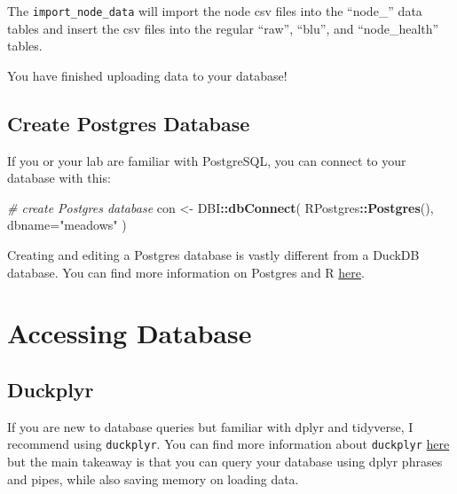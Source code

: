 \documentclass[
]{book}
\newenvironment{Shaded}{\begin{snugshade}}{\end{snugshade}}
\newcommand{\AttributeTok}[1]{\textcolor[rgb]{0.13,0.29,0.53}{#1}}
\newcommand{\CommentTok}[1]{\textcolor[rgb]{0.56,0.35,0.01}{\textit{#1}}}
\newcommand{\FunctionTok}[1]{\textcolor[rgb]{0.13,0.29,0.53}{\textbf{#1}}}
\newcommand{\NormalTok}[1]{#1}
\newcommand{\OtherTok}[1]{\textcolor[rgb]{0.56,0.35,0.01}{#1}}
\newcommand{\SpecialCharTok}[1]{\textcolor[rgb]{0.81,0.36,0.00}{\textbf{#1}}}
\newcommand{\StringTok}[1]{\textcolor[rgb]{0.31,0.60,0.02}{#1}}
\begin{document}
The \texttt{import\_node\_data} will import the node csv files into the ``node\_'' data tables and insert the csv files into the regular ``raw'', ``blu'', and ``node\_health'' tables.

You have finished uploading data to your database!

\section{Create Postgres Database}\label{create-postgres-database}

If you or your lab are familiar with PostgreSQL, you can connect to your database with this:

\begin{Shaded}
\begin{Highlighting}[]
\CommentTok{\# create Postgres database}
\NormalTok{con }\OtherTok{\textless{}{-}}\NormalTok{ DBI}\SpecialCharTok{::}\FunctionTok{dbConnect}\NormalTok{(}
\NormalTok{  RPostgres}\SpecialCharTok{::}\FunctionTok{Postgres}\NormalTok{(),}
  \AttributeTok{dbname=}\StringTok{"meadows"}
\NormalTok{)}
\end{Highlighting}
\end{Shaded}

Creating and editing a Postgres database is vastly different from a DuckDB database. You can find more information on Postgres and R \href{https://faculty.washington.edu/phurvitz/r_sql/createdb.html}{here}.

\chapter{Accessing Database}\label{accessing-database}

\section{Duckplyr}\label{duckplyr}

If you are new to database queries but familiar with dplyr and tidyverse, I recommend using \texttt{duckplyr}. You can find more information about \texttt{duckplyr} \href{https://duckdb.org/2024/04/02/duckplyr.html}{here} but the main takeaway is that you can query your database using dplyr phrases and pipes, while also saving memory on loading data.
\end{document}
